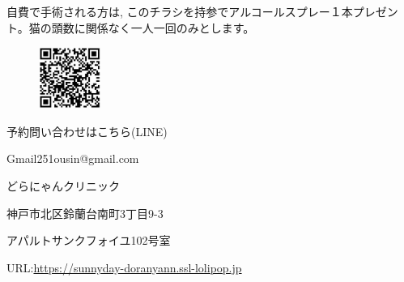 \documentclass{jsarticle}
\begin{document}
	\vspace{120pt}
	自費で手術される方は, このチラシを持参でアルコールスプレー１本プレゼント。猫の頭数に関係なく一人一回のみとします。

	\vspace{20pt}
	\begin{figure}
		\vspace*{-\intextsep}
		\hspace{-60pt}
		\includegraphics[width=2cm]{qr.jpg}
	\end{figure}
	予約問い合わせはこちら(LINE)

	Gmail\hspace{8pt}251ousin@gmail.com

	\vspace{30pt}
	\huge
	どらにゃんクリニック
\Large

	神戸市北区鈴蘭台南町3丁目9-3

	アパルトサンクフォイユ102号室

	URL:\url{https://sunnyday-doranyann.ssl-lolipop.jp}
\end{document}
